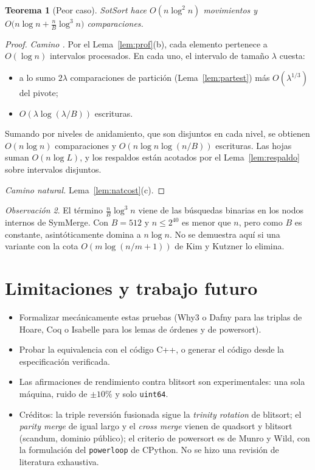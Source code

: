 \documentclass[10pt,a4paper]{article}
\theoremstyle{plain}
\newtheorem{teorema}{Teorema}[section]
\theoremstyle{definition}
\theoremstyle{remark}
\newtheorem{observacion}[teorema]{Observación}
\newcommand{\Bsz}{B}
\newcommand{\leaf}{L}
\begin{document}
\begin{teorema}[Peor caso]\label{thm:cost}
SotSort hace $O(n\log^2 n)$ movimientos y
$O\!\big(n\log n+\frac{n}{\Bsz}\log^3 n\big)$ comparaciones.
\end{teorema}
\begin{proof}
\emph{Camino \Quick.} Por el Lema~\ref{lem:prof}(b), cada elemento pertenece a
$O(\log n)$ intervalos procesados. En cada uno, el intervalo de tamaño $\lambda$
cuesta:
\begin{itemize}[nosep]
\item a lo sumo $2\lambda$ comparaciones de partición (Lema~\ref{lem:partest}) más
  $O(\lambda^{1/3})$ del pivote;
\item $O(\lambda\log(\lambda/\Bsz))$ escrituras.
\end{itemize}
Sumando por niveles de anidamiento, que son disjuntos en cada nivel, se obtienen
$O(n\log n)$ comparaciones y $O(n\log n\log(n/\Bsz))$ escrituras. Las hojas suman
$O(n\log\leaf)$, y los respaldos están acotados por el Lema~\ref{lem:respaldo} sobre
intervalos disjuntos.

\emph{Camino natural.} Lema~\ref{lem:natcost}(c).
\end{proof}

\begin{observacion}
El término $\frac{n}{\Bsz}\log^3 n$ viene de las búsquedas binarias en los nodos
internos de SymMerge. Con $\Bsz=512$ y $n\le 2^{40}$ es menor que $n$, pero como
$\Bsz$ es constante, asintóticamente domina a $n\log n$. No se demuestra aquí si una
variante con la cota $O(m\log(n/m+1))$ de Kim y Kutzner lo elimina.
\end{observacion}







\section{Limitaciones y trabajo futuro}
\begin{itemize}[nosep]
\item Formalizar mecánicamente estas pruebas (Why3 o Dafny para las triplas de Hoare,
  Coq o Isabelle para los lemas de órdenes y de powersort).
\item Probar la equivalencia con el código C++, o generar el código desde la
  especificación verificada.
\item Las afirmaciones de rendimiento contra blitsort son experimentales: una sola
  máquina, ruido de $\pm10\%$ y solo \texttt{uint64}.
\item Créditos: la triple reversión fusionada sigue la \emph{trinity rotation} de
  blitsort; el \emph{parity merge} de igual largo y el \emph{cross merge} vienen de
  quadsort y blitsort (scandum, dominio público); el criterio de powersort es de
  Munro y Wild, con la formulación del \texttt{powerloop} de CPython. No se hizo una
  revisión de literatura exhaustiva.
\end{itemize}
\end{document}
